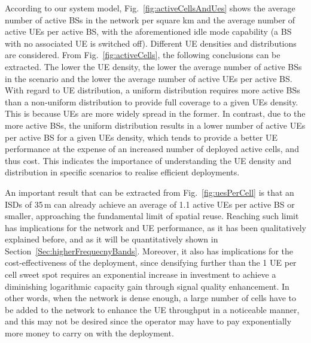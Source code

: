 \documentclass{IEEEtran}
\begin{document}
According to our system model,
Fig.~\ref{fig:activeCellsAndUes} shows
the average number of active \acp{BS} in the network per square km and the average number of active \acp{UE} per active \ac{BS},
with the aforementioned idle mode capability (a \ac{BS} with no associated \ac{UE} is switched off).
Different \ac{UE} densities and distributions are considered.
From Fig.~\ref{fig:activeCells}, the following conclusions can be extracted.
The lower the \ac{UE} density,
the lower the average number of active \acp{BS} in the scenario and the lower the average number of active \acp{UE} per active \ac{BS}.
With regard to \ac{UE} distribution,
a uniform distribution requires more active \acp{BS} than a non-uniform distribution to provide full coverage to a given \acp{UE} density.
This is because \acp{UE} are more widely spread in the former.
In contrast,
due to the more active \acp{BS},
the uniform distribution results in a lower number of active \acp{UE} per active \ac{BS} for a given \acp{UE} density,
which tends to provide a better \ac{UE} performance at the expense of an increased number of deployed active cells,
and thus cost.
This indicates the importance of understanding the \ac{UE} density and distribution in specific scenarios to realise efficient deployments.


\begin{figure*}[t]
  \centering
  \caption{Transmit power per active \ac{BS} and transmit power of the network per km.
  The \ac{UE} densities are 600, 300 and 100 active \acp{UE} per km.
  The UE distributions are uniform and non-uniform within the scenario.
  The rest of the parameters are , \,GHz,  and 12\,dB.
  It is important to note that in Fig.~\ref{fig:txPowerCells} there are 6 overlapping curves. This is because the power used by the cell if it is activated does not depend on the UE density. }
\label{fig:txPower}
\end{figure*}

An important result that can be extracted from Fig.~\ref{fig:uesPerCell} is that
an \acp{ISD} of 35\,m can already achieve an average of 1.1 active \acp{UE} per active \ac{BS} or smaller,
approaching the fundamental limit of spatial reuse.
Reaching such limit has implications for the network and \ac{UE} performance,
as it has been qualitatively explained before,
and as it will be quantitatively shown in Section~\ref{Sec:higherFrequecnyBands}.
Moreover, it also has implications for the cost-effectiveness of the deployment,
since densifying further than the 1 \ac{UE} per cell sweet spot requires an exponential increase in investment to achieve a diminishing logarithmic capacity gain through signal quality enhancement.
In other words, when the network is dense enough,
a large number of cells have to be added to the network to enhance the \ac{UE} throughput in a noticeable manner,
and this may not be desired since the operator may have to pay exponentially more money to carry on with the deployment.
\end{document}
